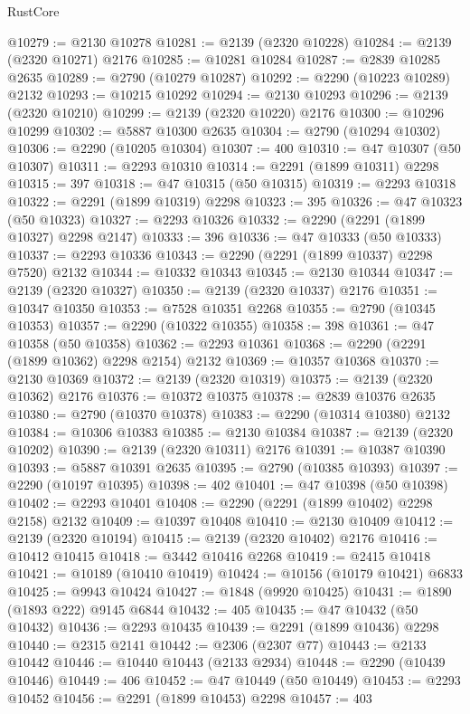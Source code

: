 \begin{lexlean}{RustCore}
\begin{coremodule}
@10279 := @2130 @10278
@10281 := @2139 (@2320 @10228)
@10284 := @2139 (@2320 @10271) @2176
@10285 := @10281 @10284
@10287 := @2839 @10285 @2635
@10289 := @2790 (@10279 @10287)
@10292 := @2290 (@10223 @10289) @2132
@10293 := @10215 @10292
@10294 := @2130 @10293
@10296 := @2139 (@2320 @10210)
@10299 := @2139 (@2320 @10220) @2176
@10300 := @10296 @10299
@10302 := @5887 @10300 @2635
@10304 := @2790 (@10294 @10302)
@10306 := @2290 (@10205 @10304)
@10307 := 400
@10310 := @47 @10307 (@50 @10307)
@10311 := @2293 @10310
@10314 := @2291 (@1899 @10311) @2298
@10315 := 397
@10318 := @47 @10315 (@50 @10315)
@10319 := @2293 @10318
@10322 := @2291 (@1899 @10319) @2298
@10323 := 395
@10326 := @47 @10323 (@50 @10323)
@10327 := @2293 @10326
@10332 := @2290 (@2291 (@1899 @10327) @2298 @2147)
@10333 := 396
@10336 := @47 @10333 (@50 @10333)
@10337 := @2293 @10336
@10343 := @2290 (@2291 (@1899 @10337) @2298 @7520) @2132
@10344 := @10332 @10343
@10345 := @2130 @10344
@10347 := @2139 (@2320 @10327)
@10350 := @2139 (@2320 @10337) @2176
@10351 := @10347 @10350
@10353 := @7528 @10351 @2268
@10355 := @2790 (@10345 @10353)
@10357 := @2290 (@10322 @10355)
@10358 := 398
@10361 := @47 @10358 (@50 @10358)
@10362 := @2293 @10361
@10368 := @2290 (@2291 (@1899 @10362) @2298 @2154) @2132
@10369 := @10357 @10368
@10370 := @2130 @10369
@10372 := @2139 (@2320 @10319)
@10375 := @2139 (@2320 @10362) @2176
@10376 := @10372 @10375
@10378 := @2839 @10376 @2635
@10380 := @2790 (@10370 @10378)
@10383 := @2290 (@10314 @10380) @2132
@10384 := @10306 @10383
@10385 := @2130 @10384
@10387 := @2139 (@2320 @10202)
@10390 := @2139 (@2320 @10311) @2176
@10391 := @10387 @10390
@10393 := @5887 @10391 @2635
@10395 := @2790 (@10385 @10393)
@10397 := @2290 (@10197 @10395)
@10398 := 402
@10401 := @47 @10398 (@50 @10398)
@10402 := @2293 @10401
@10408 := @2290 (@2291 (@1899 @10402) @2298 @2158) @2132
@10409 := @10397 @10408
@10410 := @2130 @10409
@10412 := @2139 (@2320 @10194)
@10415 := @2139 (@2320 @10402) @2176
@10416 := @10412 @10415
@10418 := @3442 @10416 @2268
@10419 := @2415 @10418
@10421 := @10189 (@10410 @10419)
@10424 := @10156 (@10179 @10421) @6833
@10425 := @9943 @10424
@10427 := @1848 (@9920 @10425)
@10431 := @1890 (@1893 @222) @9145 @6844
@10432 := 405
@10435 := @47 @10432 (@50 @10432)
@10436 := @2293 @10435
@10439 := @2291 (@1899 @10436) @2298
@10440 := @2315 @2141
@10442 := @2306 (@2307 @77)
@10443 := @2133 @10442
@10446 := @10440 @10443 (@2133 @2934)
@10448 := @2290 (@10439 @10446)
@10449 := 406
@10452 := @47 @10449 (@50 @10449)
@10453 := @2293 @10452
@10456 := @2291 (@1899 @10453) @2298
@10457 := 403

\end{coremodule}
\end{lexlean}
